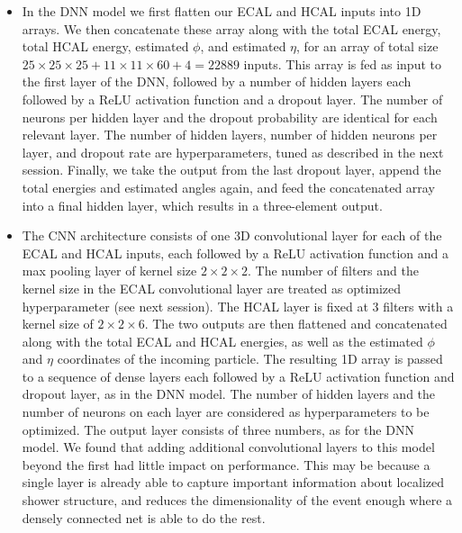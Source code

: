 \begin{itemize}
    \item In the DNN model we first flatten our ECAL and HCAL inputs into 1D arrays. We then concatenate these array along with the total ECAL energy, total HCAL energy, estimated $\phi$, and estimated $\eta$, for an array of total size $25 \times 25 \times 25 + 11 \times 11 \times 60 + 4 = 22889$ inputs. This array is fed as input to the first layer of the DNN, followed by a number of hidden layers each followed by a ReLU activation function and a dropout layer. The number of neurons per hidden layer and the dropout probability are identical for each relevant layer. The number of hidden layers, number of hidden neurons per layer, and dropout rate are hyperparameters, tuned as described in the next session.  Finally, we take the output from the last dropout layer, append the total energies and estimated angles again, and feed the concatenated array into a final hidden layer, which results in a three-element output. 
    \item The CNN architecture consists of one 3D convolutional layer for each of the ECAL and HCAL inputs, each followed by a ReLU activation function and a max pooling layer of kernel size $2 \times 2 \times 2$. The number of filters and the kernel size in the ECAL convolutional layer are treated as optimized hyperparameter (see next session). The HCAL layer is fixed at 3 filters with a kernel size of $2 \times 2 \times 6$. The two outputs are then flattened and concatenated along with the total ECAL and HCAL energies, as well as the estimated $\phi$ and $\eta$ coordinates of the incoming particle. The resulting 1D array is passed to a sequence of dense layers each followed by a ReLU activation function and dropout layer, as in the DNN model. The number of hidden layers and the number of neurons on each layer are considered as hyperparameters to be optimized. The output layer consists of three numbers, as for the DNN model. We found that adding additional convolutional layers to this model beyond the first had little impact on performance. This may be because a single layer is already able to capture important information about localized shower structure, and reduces the dimensionality of the event enough where a densely connected net is able to do the rest.

\end{itemize}

